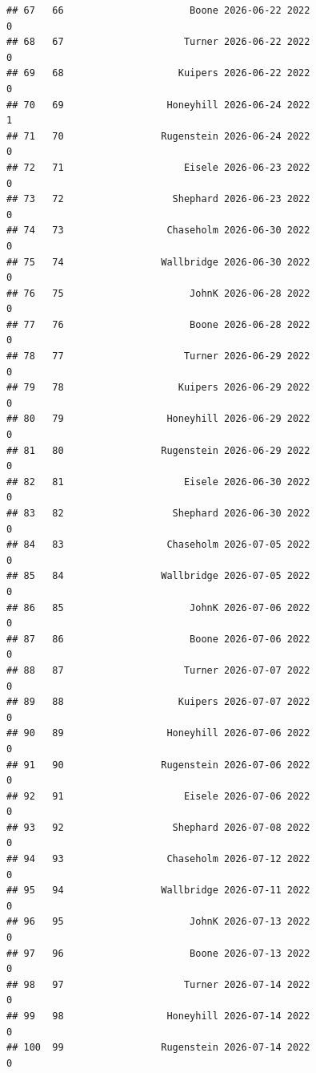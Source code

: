\documentclass[
]{article}
\begin{document}
\begin{verbatim}
## 67   66                      Boone 2026-06-22 2022                       0
## 68   67                     Turner 2026-06-22 2022                       0
## 69   68                    Kuipers 2026-06-22 2022                       0
## 70   69                  Honeyhill 2026-06-24 2022                       1
## 71   70                 Rugenstein 2026-06-24 2022                       0
## 72   71                     Eisele 2026-06-23 2022                       0
## 73   72                   Shephard 2026-06-23 2022                       0
## 74   73                  Chaseholm 2026-06-30 2022                       0
## 75   74                 Wallbridge 2026-06-30 2022                       0
## 76   75                      JohnK 2026-06-28 2022                       0
## 77   76                      Boone 2026-06-28 2022                       0
## 78   77                     Turner 2026-06-29 2022                       0
## 79   78                    Kuipers 2026-06-29 2022                       0
## 80   79                  Honeyhill 2026-06-29 2022                       0
## 81   80                 Rugenstein 2026-06-29 2022                       0
## 82   81                     Eisele 2026-06-30 2022                       0
## 83   82                   Shephard 2026-06-30 2022                       0
## 84   83                  Chaseholm 2026-07-05 2022                       0
## 85   84                 Wallbridge 2026-07-05 2022                       0
## 86   85                      JohnK 2026-07-06 2022                       0
## 87   86                      Boone 2026-07-06 2022                       0
## 88   87                     Turner 2026-07-07 2022                       0
## 89   88                    Kuipers 2026-07-07 2022                       0
## 90   89                  Honeyhill 2026-07-06 2022                       0
## 91   90                 Rugenstein 2026-07-06 2022                       0
## 92   91                     Eisele 2026-07-06 2022                       0
## 93   92                   Shephard 2026-07-08 2022                       0
## 94   93                  Chaseholm 2026-07-12 2022                       0
## 95   94                 Wallbridge 2026-07-11 2022                       0
## 96   95                      JohnK 2026-07-13 2022                       0
## 97   96                      Boone 2026-07-13 2022                       0
## 98   97                     Turner 2026-07-14 2022                       0
## 99   98                  Honeyhill 2026-07-14 2022                       0
## 100  99                 Rugenstein 2026-07-14 2022                       0

\end{verbatim}
\end{document}
